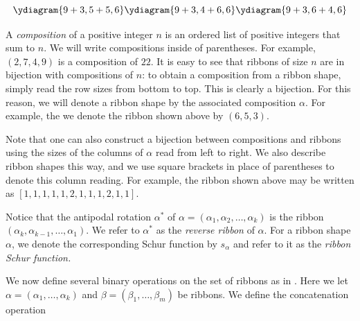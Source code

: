 \documentclass[12pt]{amsart}
\theoremstyle{definition}
\newcommand{\Becky}[1]{\todo[size=\tiny,inline,color=blue!30]{#1
      \\ \hfill --- B.}}
\begin{document}
$$\ydiagram{9+3,5+5,6}\ydiagram{9+3,4+6,6}\ydiagram{9+3,6+4,6}$$



A \textit{composition} of a positive integer $n$ is an ordered list of positive integers that sum to $n$. We will write compositions inside of parentheses. For example, $(2,7,4,9)$ is a composition of $22$. It is easy to see that ribbons of size $n$ are in bijection with compositions of $n$: to obtain a composition from a ribbon shape, simply read the row sizes from bottom to top. This is clearly a bijection. For this reason, we will denote a ribbon shape by the associated composition $\alpha$. For example, the we denote the ribbon shown above by $(6,5,3)$. 


Note that one can also construct a bijection between compositions and ribbons using the sizes of the columns of $\alpha$ read from left to right. We also describe ribbon shapes this way, and we use square brackets in place of parentheses to denote this column reading. For example, the ribbon shown above may be written as $[1,1,1,1,1,2,1,1,1,2,1,1]$.


Notice that the antipodal rotation $\alpha^{*}$ of $\alpha=(\alpha_1, \alpha_2,\ldots,\alpha_k)$ is the ribbon  $(\alpha_k,\alpha_{k-1},\ldots,\alpha_1)$. We refer to $\alpha^*$ as the \textit{reverse ribbon} of $\alpha$. For a ribbon shape $\alpha$, we denote the corresponding Schur function by $s_\alpha$ and refer to it as the \textit{ribbon Schur function.} 

We now define several binary operations on the set of ribbons as in \cite{rsw2009coincidences}. %
Here we let $\alpha = (\alpha_1,\ldots,\alpha_k)$ and $\beta = (\beta_1,\ldots,\beta_m)$ be ribbons. We define the concatenation operation
\end{document}
